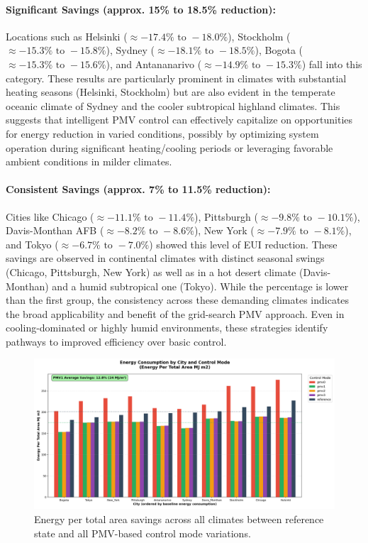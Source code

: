 \paragraph{Significant Savings (approx. 15\% to 18.5\% reduction):} Locations such as Helsinki ($ \approx -17.4\% \text{ to } -18.0\%$), Stockholm ($ \approx -15.3\% \text{ to } -15.8\%$), Sydney ($ \approx -18.1\% \text{ to } -18.5\%$), Bogota ($ \approx -15.3\% \text{ to } -15.6\%$), and Antananarivo ($ \approx -14.9\% \text{ to } -15.3\%$) fall into this category. These results are particularly prominent in climates with substantial heating seasons (Helsinki, Stockholm) but are also evident in the temperate oceanic climate of Sydney and the cooler subtropical highland climates. This suggests that intelligent PMV control can effectively capitalize on opportunities for energy reduction in varied conditions, possibly by optimizing system operation during significant heating/cooling periods or leveraging favorable ambient conditions in milder climates.

\paragraph{Consistent Savings (approx. 7\% to 11.5\% reduction):} Cities like Chicago ($ \approx -11.1\% \text{ to } -11.4\%$), Pittsburgh ($ \approx -9.8\% \text{ to } -10.1\%$), Davis-Monthan AFB ($ \approx -8.2\% \text{ to } -8.6\%$), New York ($ \approx -7.9\% \text{ to } -8.1\%$), and Tokyo ($ \approx -6.7\% \text{ to } -7.0\%$) showed this level of EUI reduction. These savings are observed in continental climates with distinct seasonal swings (Chicago, Pittsburgh, New York) as well as in a hot desert climate (Davis-Monthan) and a humid subtropical one (Tokyo). While the percentage is lower than the first group, the consistency across these demanding climates indicates the broad applicability and benefit of the grid-search PMV approach. Even in cooling-dominated or highly humid environments, these strategies identify pathways to improved efficiency over basic control. 

\begin{figure}[h!]
    \centering
    \includegraphics[width=0.95\linewidth]{figs/Energy_Per_Total_Area_MJ_m2_pmv.png}
    \caption{Energy per total area savings across all climates between reference state and all PMV-based control mode variations.}
    \label{fig:MJm2pmv}
\end{figure}

